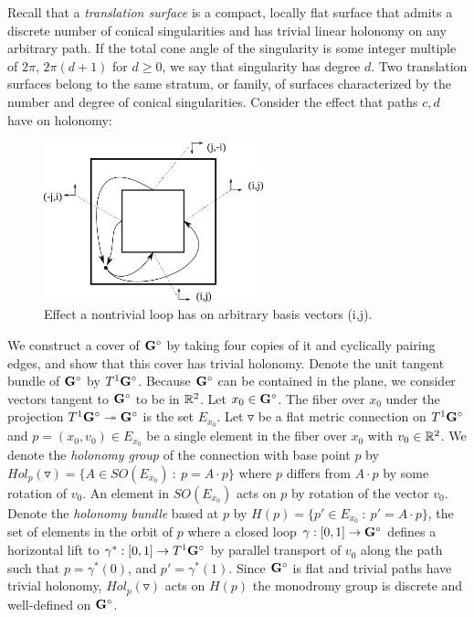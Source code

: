 \documentclass[]{article}
\begin{document}
Recall that a \emph{translation surface} is a compact, locally flat surface that admits a discrete number of conical singularities and has trivial linear holonomy on any arbitrary path. If the total cone angle of the singularity is some integer multiple of $2\pi$, $2\pi(d+1)$ for $d\geq 0$, we say that singularity has degree $d$. Two translation surfaces belong to the same stratum, or family, of surfaces characterized by the number and degree of conical singularities. Consider the effect that paths $c,d$ have on holonomy: 

\begin{figure}[H]
\centering
\includegraphics[width=2.5in]{monodromy.png}
\caption{Effect a nontrivial loop has on arbitrary basis vectors (i,j).}
\label{fig:loop}
\end{figure}

We construct a cover of $\mathbf{G}^\circ$ by taking four copies of it and cyclically pairing edges, and show that this cover has trivial holonomy. Denote the unit tangent bundle of $\mathbf{G}^\circ$ by $T^1\mathbf{G}^\circ$. Because $\mathbf{G}^\circ$ can be contained in the plane, we consider vectors tangent to $\mathbf{G}^\circ$ to be in $\mathbb{R}^2$. Let $x_0\in\mathbf{G}^\circ$. The fiber over $x_0$ under the projection $T^1\mathbf{G}^\circ\twoheadrightarrow\mathbf{G}^\circ$ is the set $E_{x_0}$. Let $\triangledown$ be a flat metric connection on $T^1\mathbf{G}^\circ$ and $p=(x_0,v_0)\in E_{x_0}$ be a single element in the fiber over $x_0$ with $v_0\in\mathbb{R}^2$. We denote the \emph{holonomy group} of the connection with base point $p$ by $Hol_p(\triangledown)=\{A\in SO(E_{x_0})~:~ p = A\cdot p\}$ where $p$ differs from $A\cdot p$ by some rotation of $v_0$. An element in $SO(E_{x_0})$ acts on $p$ by rotation of the vector $v_0$. Denote the \emph{holonomy bundle} based at $p$ by $H(p)=\{p'\in E_{x_0}~:~ p'= A\cdot p \}$, the set of elements in the orbit of $p$ where a closed loop $\gamma:[0,1]\rightarrow\mathbf{G}^\circ$ defines a horizontal lift to $\gamma^*:[0,1]\rightarrow T^1\mathbf{G}^\circ$ by parallel transport of $v_0$ along the path such that $p=\gamma^*(0)$, and $p'=\gamma^*(1)$. Since $\mathbf{G}^\circ$ is flat and trivial paths have trivial holonomy, $Hol_p(\triangledown)$ acts on $H(p)$ the monodromy group is discrete and well-defined on $\mathbf{G}^\circ$.
\end{document}
